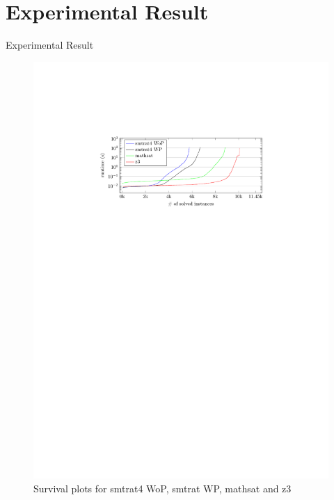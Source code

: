 \documentclass[]{beamer}
\begin{document}
\section{Experimental Result}
\begin{frame}{Experimental Result}
\begin{figure}
    \caption{Survival plots for smtrat4 WoP, smtrat WP, mathsat and z3}
    \centering
    \includegraphics[scale=1]{../figures/solved_instances.pdf}
\end{figure}
\end{frame}
\end{document}
